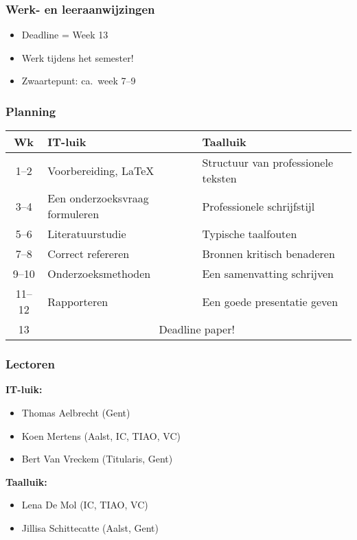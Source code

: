 \documentclass[aspectratio=169]{beamer}
\begin{document}
\begin{frame}
  \frametitle{Werk- en leeraanwijzingen}

  \begin{itemize}
    \item Deadline = Week 13
    \item Werk tijdens het semester!
    \item Zwaartepunt: ca.\ week 7--9
  \end{itemize}

\end{frame}

\begin{frame}
  \frametitle{Planning}

  \begin{table}
    \centering
    \small
    \begin{tabular}{cll}
      \toprule
      \textbf{Wk} & \textbf{IT-luik}                    & \textbf{Taalluik}                   \\
      \midrule
      1--2        & Voorbereiding, {\LaTeX}             & Structuur van professionele teksten \\
      3--4        & Een onderzoeksvraag formuleren      & Professionele schrijfstijl          \\
      5--6        & Literatuurstudie                    & Typische taalfouten                 \\
      7--8        & Correct refereren                   & Bronnen kritisch benaderen          \\
      9--10       & Onderzoeksmethoden                  & Een samenvatting schrijven          \\
      11--12      & Rapporteren                         & Een goede presentatie geven         \\
      13          & \multicolumn{2}{c}{Deadline paper!}                                       \\
      \bottomrule
    \end{tabular}
  \end{table}
\end{frame}

\begin{frame}
  \frametitle{Lectoren}

  \textbf{IT-luik:}

  \begin{itemize}
    \item Thomas Aelbrecht (Gent)
    \item Koen Mertens (Aalst, IC, TIAO, VC)
    \item Bert Van Vreckem (Titularis, Gent)
  \end{itemize}

  \bigskip
  \textbf{Taalluik:}

  \begin{itemize}
    \item Lena De Mol (IC, TIAO, VC)
    \item Jillisa Schittecatte (Aalst, Gent)
  \end{itemize}
\end{frame}
\end{document}
